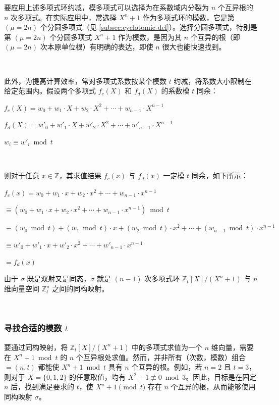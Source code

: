 要应用上述多项式环约减，模多项式可以选择为在系数域内分裂为 $n$ 个互异根的 $n$ 次多项式。在实际应用中，常选择 $X^n + 1$ 作为多项式环的模数，它是第 $(\mu=2n)$ 个分圆多项式（见 \autoref{subsec:cyclotomic-def}）。选择分圆多项式，特别是第 $(\mu=2n)$ 个分圆多项式 $X^n + 1$ 作为模数，是因为其 $n$ 个互异的根（即 $(\mu=2n)$ 次本原单位根）有明确的表达，即使 $n$ 很大也能快速找到。

$ $

此外，为提高计算效率，常对多项式系数按某个模数 $t$ 约减，将系数大小限制在给定范围内。假设两个多项式 $f_c(X)$ 和 $f_d(X)$ 的系数模 $t$ 同余：

$f_c(X) = w_0 + w_1\cdot X + w_2\cdot X^2 + \cdots + w_{n-1}\cdot X^{n-1}$

$f_d(X) = w'_0 + w'_1\cdot X + w'_2\cdot X^2 + \cdots + w'_{n-1}\cdot X^{n-1} $

$w_i \equiv w'_i \bmod t$

$ $

则对于任意 $x \in \mathbb{Z}$，其求值结果 $f_c(x)$ 与 $f_d(x)$ 一定模 $t$ 同余，如下所示：

$f_c(x) = w_0 + w_1\cdot x + w_2\cdot x^2 + \cdots + w_{n-1}\cdot x^{n-1}$

$\equiv (w_0 + w_1\cdot x + w_2\cdot x^2 + \cdots + w_{n-1}\cdot x^{n-1}) \bmod t $

$\equiv (w_0  \bmod t) + (w_1  \bmod t)\cdot x + (w_2  \bmod t)\cdot x^2 + \cdots + (w_{n-1} \bmod t)\cdot x^{n-1} $

$\equiv w'_0 + w'_1\cdot x + w'_2\cdot x^2 + \cdots + w'_{n-1}\cdot x^{n-1} $

$= f_d(x)$

由于 $\sigma$ 既是双射又是同态，$\sigma$ 就是 $(n-1)$ 次多项式环 $\mathbb{Z}_t[X]/(X^n + 1)$ 与 $n$ 维向量空间 $\mathbb{Z}_t^n$ 之间的同构映射。


$ $


\subsubsection{寻找合适的模数 $t$}
\label{subsubsec:poly-vector-transformation-modulus}

要通过同构映射，将 $\mathbb{Z}_t[X]/(X^n + 1)$ 中的多项式求值为一个 $n$ 维向量，需要在 $X^n + 1 \bmod t$ 的 $n$ 个互异根处求值。然而，并非所有（次数，模数）组合 $ = (n, t)$ 都能使 $X^n + 1 \bmod t$ 具有 $n$ 个互异的根。例如，若 $n = 2$ 且 $t = 3$，则对于 $X = \{0, 1, 2\}$ 的任意取值，均有 $X^2+ 1 \not\equiv 0 \bmod 3$。因此，目标是在固定 $n$ 后，找到满足要求的 $t$，使 $X^n + 1 \pmod t$ 存在 $n$ 个互异的根，从而能够使用同构映射 $\sigma$。

